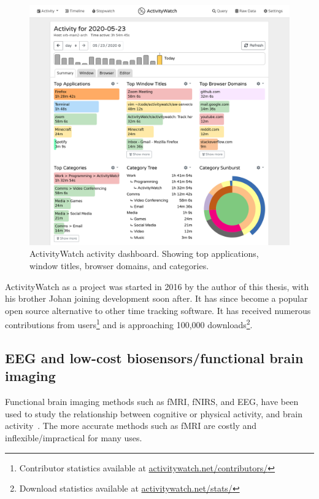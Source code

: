 
        \begin{figure}[h]
        \centering
        \includegraphics[width=12cm]{img/screenshot-aw-activity.png}
        \caption{ActivityWatch activity dashboard. Showing top applications, window titles, browser domains, and categories.}\label{fig:aw}
        \end{figure}

        ActivityWatch as a project was started in 2016 by the author of this thesis, with his brother Johan joining development soon after. It has since become a popular open source alternative to other time tracking software. It has received numerous contributions from users\footnote{Contributor statistics available at \href{https://activitywatch.net/contributors/}{activitywatch.net/contributors/}} and is approaching 100,000 downloads\footnote{Download statistics available at \href{https://activitywatch.net/stats/}{activitywatch.net/stats/}}.


\subsection{EEG and low-cost biosensors/functional brain imaging}

    Functional brain imaging methods such as fMRI, fNIRS, and EEG, have been used to study the relationship between cognitive or physical activity, and brain activity~\cite{floyd_decoding_2017}\cite{hong_classification_2015}\cite{fucci_replication_2019}. The more accurate methods such as fMRI are costly and inflexible/impractical for many uses.

